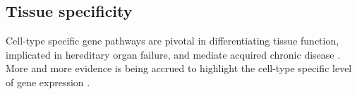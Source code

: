 \documentclass[12pt]{article} %
\begin{document}
%	
%	
	
	\subsection{Tissue specificity} \label{sec:tissue_specificity}
	Cell-type specific gene pathways are pivotal in differentiating tissue function, implicated in hereditary organ failure, and mediate acquired chronic disease \cite{JuDefiningcelltypespecificity2013a}. More and more evidence is being accrued to highlight the cell-type specific level of gene expression \cite{GrundbergMappingcistransregulatory2012}\cite{OngEnhancerfunctionnew2011}\cite{ManiatisRegulationinducibletissuespecific1987}. 
	
	
\end{document}
